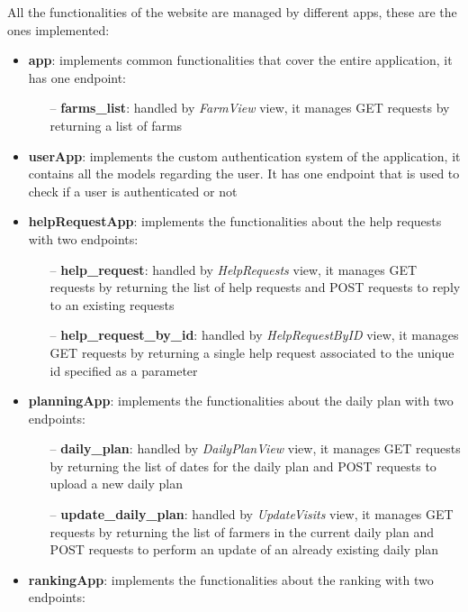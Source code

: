 \documentclass[table, 12pt]{article}
\begin{document}
All the functionalities of the website are managed by different apps, these are the ones implemented:
\begin{itemize}
    \item \textbf{app}: implements common functionalities that cover the entire application, it has one endpoint:
    \begin{itemize}
        \item[--] \textbf{farms\_list}: handled by \textit{FarmView} view, it manages GET requests by returning a list of farms
    \end{itemize}
    \item \textbf{userApp}: implements the custom authentication system of the application, it contains all the models regarding the user. It has one endpoint that is used to check if a user is authenticated or not
    \item \textbf{helpRequestApp}: implements the functionalities about the help requests with two endpoints:
    \begin{itemize}
        \item[--] \textbf{help\_request}: handled by \textit{HelpRequests} view, it manages GET requests by returning the list of help requests and POST requests to reply to an existing requests
        \item[--] \textbf{help\_request\_by\_id}: handled by \textit{HelpRequestByID} view, it manages GET requests by returning a single help request associated to the unique id specified as a parameter
    \end{itemize}
    \item \textbf{planningApp}: implements the functionalities about the daily plan with two endpoints:
    \begin{itemize}
        \item[--] \textbf{daily\_plan}: handled by \textit{DailyPlanView} view, it manages GET requests by returning the list of dates for the daily plan and POST requests to upload a new daily plan
        \item[--] \textbf{update\_daily\_plan}: handled by \textit{UpdateVisits} view, it manages GET requests by returning the list of farmers in the current daily plan and POST requests to perform an update of an already existing daily plan
    \end{itemize}
    \item \textbf{rankingApp}: implements the functionalities about the ranking with two endpoints:
    \begin{itemize}

\end{itemize}
\end{itemize}
\end{document}
